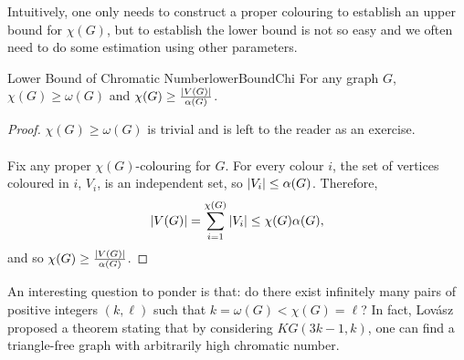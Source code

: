 \documentclass[math, code]{amznotes}
\theoremstyle{remark}
\begin{document}
Intuitively, one only needs to construct a proper colouring to establish an upper bound for $\chi(G)$, but to establish the lower bound is not so easy and we often need to do some estimation using other parameters.
\begin{probox}{Lower Bound of Chromatic Number}{lowerBoundChi}
    For any graph $G$, $\chi(G) \geq \omega(G)$ and $\chi(G) \geq \frac{{\left\lvert {V(G)} \right\rvert}}{\alpha(G)}$.
    \tcblower
    \begin{proof}
        $\chi(G) \geq \omega(G)$ is trivial and is left to the reader as an exercise.
        \\\\
        Fix any proper $\chi(G)$-colouring for $G$. For every colour $i$, the set of vertices coloured in $i$, $V_i$, is an independent set, so ${\left\lvert {V_i} \right\rvert} \leq \alpha(G)$. Therefore,
        \begin{equation*}
            {\left\lvert {V(G)} \right\rvert} = \sum_{i = 1}^{\chi(G)}{\left\lvert {V_i} \right\rvert} \leq \chi(G)\alpha(G),
        \end{equation*}
        and so $\chi(G) \geq \frac{{\left\lvert {V(G)} \right\rvert}}{\alpha(G)}$.
    \end{proof}
\end{probox}
An interesting question to ponder is that: do there exist infinitely many pairs of positive integers $(k, \ell)$ such that $k = \omega(G) < \chi(G) = \ell$? In fact, Lov\'{a}sz proposed a theorem stating that by considering $KG(3k - 1, k)$, one can find a triangle-free graph with arbitrarily high chromatic number.
\end{document}
